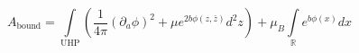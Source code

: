 \begin{equation}
A_{\mathrm{bound}}=\int\limits_{\mathrm{UHP}}\left(  \frac{1}{4\pi}(\partial_{a}%
\phi)^{2}+\mu e^{2b\phi(z,\bar{z})}d^{2}z\right)
+\mu_{B}\int\limits_{\mathbb{R}}e^{b\phi(x)}  dx\label{bound}
\nonumber
\end{equation}

